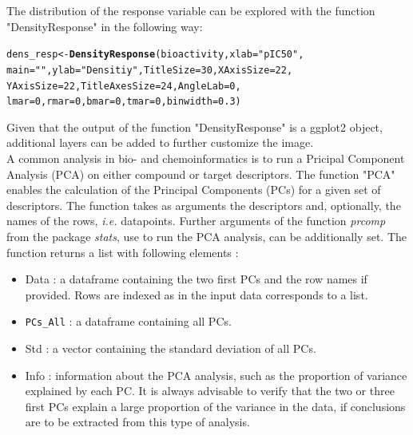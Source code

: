 \documentclass[twoside,a4wide,12pt]{article}\usepackage[]{graphicx}\usepackage[]{color}
\makeatletter
\newcommand{\hlnum}[1]{\textcolor[rgb]{0.686,0.059,0.569}{#1}}%
\newcommand{\hlstr}[1]{\textcolor[rgb]{0.192,0.494,0.8}{#1}}%
\newcommand{\hlstd}[1]{\textcolor[rgb]{0.345,0.345,0.345}{#1}}%
\newcommand{\hlkwb}[1]{\textcolor[rgb]{0.69,0.353,0.396}{#1}}%
\newcommand{\hlkwc}[1]{\textcolor[rgb]{0.333,0.667,0.333}{#1}}%
\newcommand{\hlkwd}[1]{\textcolor[rgb]{0.737,0.353,0.396}{\textbf{#1}}}%
\newenvironment{kframe}{%
 \def\at@end@of@kframe{}%
 \ifinner\ifhmode%
  \def\at@end@of@kframe{\end{minipage}}%
  \begin{minipage}{\columnwidth}%
 \fi\fi%
 \def\FrameCommand##1{\hskip\@totalleftmargin \hskip-\fboxsep
 \colorbox{shadecolor}{##1}\hskip-\fboxsep
     \hskip-\linewidth \hskip-\@totalleftmargin \hskip\columnwidth}%
 \MakeFramed {\advance\hsize-\width
   \@totalleftmargin\z@ \linewidth\hsize
   \@setminipage}}%
 {\par\unskip\endMakeFramed%
 \at@end@of@kframe}
\newenvironment{knitrout}{}{} %
\makeatother
\begin{document}
The distribution of the response variable can be explored with the function "DensityResponse" in the following way: 
\begin{knitrout}
\color{fgcolor}\begin{kframe}
\begin{alltt}
\hlstd{dens_resp} \hlkwb{<-} \hlkwd{DensityResponse}\hlstd{(bioactivity,} \hlkwc{xlab} \hlstd{=} \hlstr{"pIC50"}\hlstd{,}
    \hlkwc{main} \hlstd{=} \hlstr{""}\hlstd{,} \hlkwc{ylab} \hlstd{=} \hlstr{"Densitiy"}\hlstd{,} \hlkwc{TitleSize} \hlstd{=} \hlnum{30}\hlstd{,} \hlkwc{XAxisSize} \hlstd{=} \hlnum{22}\hlstd{,}
    \hlkwc{YAxisSize} \hlstd{=} \hlnum{22}\hlstd{,} \hlkwc{TitleAxesSize} \hlstd{=} \hlnum{24}\hlstd{,} \hlkwc{AngleLab} \hlstd{=} \hlnum{0}\hlstd{,}
    \hlkwc{lmar} \hlstd{=} \hlnum{0}\hlstd{,} \hlkwc{rmar} \hlstd{=} \hlnum{0}\hlstd{,} \hlkwc{bmar} \hlstd{=} \hlnum{0}\hlstd{,} \hlkwc{tmar} \hlstd{=} \hlnum{0}\hlstd{,} \hlkwc{binwidth} \hlstd{=} \hlnum{0.3}\hlstd{)}
\end{alltt}
\end{kframe}
\end{knitrout}
Given that the output of the function "DensityResponse" is a ggplot2 object, additional layers can be added to further customize the image.\\
A common analysis in bio- and chemoinformatics is to run a Pricipal Component Analysis (PCA) on either compound or target descriptors. 
The function "PCA" enables the calculation of the Principal Components (PCs) for a given set of descriptors.
The function takes as arguments the descriptors and, optionally, the names of the rows, {\it i.e.} datapoints.
Further arguments of the function {\it prcomp} from the package {\it stats}, use to run the PCA analysis, can be additionally set.
The function returns a list with following elements :
\begin{itemize}
\item Data : a dataframe containing the two first PCs and the row names if provided. 
Rows are indexed as in the input data corresponds to a list.
\item \verb|PCs_All| : a dataframe containing all PCs.
\item Std : a vector containing the standard deviation of all PCs.
\item Info : information about the PCA analysis, such as the proportion of variance explained by each PC.
It is always advisable to verify that the two or three first PCs explain a large proportion of the variance in the data,
if conclusions are to be extracted from this type of analysis.
\end{itemize}
\end{document}
